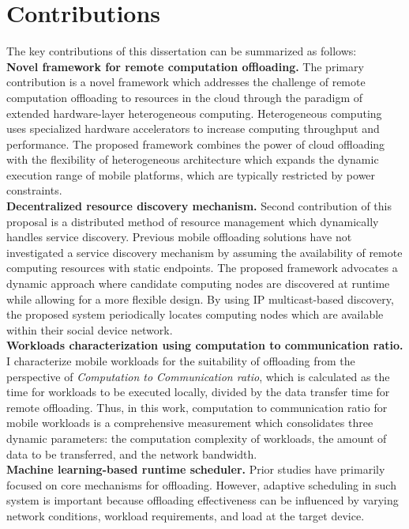 \section{Contributions}
\label{intro:contributions}
The key contributions of this dissertation can be summarized as
follows:\\
%
{\bf Novel framework for remote computation offloading.} The primary
contribution is a novel framework which addresses the challenge of
remote computation offloading to resources in the cloud through the paradigm of
extended hardware-layer heterogeneous computing.
%
Heterogeneous computing uses specialized hardware accelerators to
increase computing throughput and performance.
%
The proposed framework combines the power of cloud offloading with the
flexibility of heterogeneous architecture which expands the dynamic
execution range of mobile platforms, which are typically restricted by
power constraints.\\
%
{\bf Decentralized resource discovery mechanism.} Second
contribution of this proposal is a distributed method of resource
management which dynamically handles service discovery.
%
Previous mobile offloading solutions have not investigated a service
discovery mechanism by assuming the availability of remote computing
resources with static endpoints.
%
The proposed framework advocates a dynamic approach where candidate
computing nodes are discovered at runtime while allowing for a more
flexible design.
%
By using IP multicast-based discovery, the proposed system periodically
locates computing nodes which are available within their social device
network.\\
%
{\bf Workloads characterization using computation to communication
ratio.} 
%
I characterize mobile workloads for the suitability of offloading from
the perspective of {\it Computation to Communication ratio}, which is
calculated as the time for workloads to be executed locally, divided by
the data transfer time for remote offloading.
%
Thus, in this work, computation to communication ratio for mobile
workloads is a comprehensive measurement which consolidates three dynamic
parameters: the computation complexity of workloads, the amount of
data to be transferred, and the network bandwidth.\\
%
{\bf Machine learning-based runtime scheduler.} Prior studies have
primarily focused on core mechanisms for offloading.
%
However, adaptive scheduling in such system is important because
offloading effectiveness can be influenced by varying network
conditions, workload requirements, and load at the target device.
